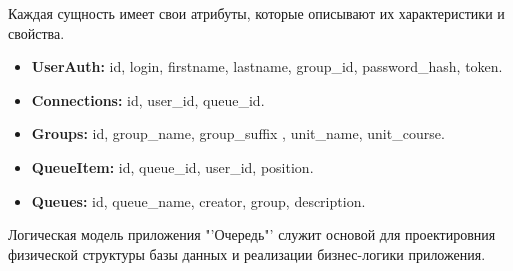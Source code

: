 
Каждая сущность имеет свои атрибуты,
которые описывают их характеристики и свойства.

\begin{itemize}
    \item \textbf{UserAuth:} id, login, firstname, lastname, group\_id,
		password\_hash, token.
    \item \textbf{Connections:} id, user\_id, queue\_id.
    \item \textbf{Groups:} id, group\_name, group\_suffix
		, unit\_name, unit\_course.
    \item \textbf{QueueItem:} id, queue\_id, user\_id, position.
    \item \textbf{Queues:} id, queue\_name, creator, group, description.
\end{itemize}

Логическая модель приложения "'Очередь"' служит основой для проектировния
физической структуры базы данных и реализации бизнес-логики приложения.

